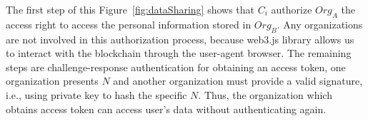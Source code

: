     The first step of this Figure~\ref{fig:dataSharing} shows that \(C_i\) authorize \(Org_A\) the access right to access the personal information stored in \(Org_B\). Any organizations are not involved in this authorization process, because web3.js library allows us to interact with the blockchain through the user-agent browser. The remaining steps are challenge-response authentication for obtaining an access token, one organization presents \(N\) and another organization must provide a valid signature, i.e., using private key to hash the specific \(N\). Thus, the organization which obtains access token can access user's data without authenticating again.
    
    \newpage